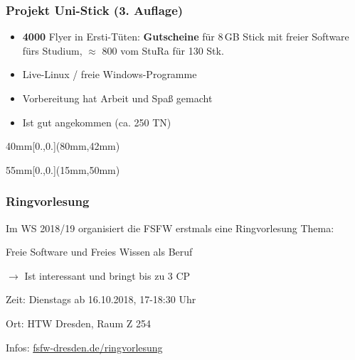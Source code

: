 \documentclass{beamer}
\begin{document}
\begin{frame}[label=ct1b,t]
  \frametitle{Projekt Uni-Stick (3. Auflage)}

  \begin{itemize}
  \item \textbf{4000} Flyer in Ersti-Tüten: \textbf{Gutscheine} für 8\,GB Stick mit freier Software
    fürs Studium, $\approx$ 800 \geneuro{} vom StuRa für 130 Stk.
  \item Live-Linux / freie Windows-Programme
    \pause
  \item Vorbereitung hat Arbeit und Spaß gemacht
    \pause
  \item Ist gut angekommen (ca. 250 TN)
  \end{itemize}

  \begin{textblock*}{40mm}[0.,0.](80mm,42mm)
  \end{textblock*}

  \begin{textblock*}{55mm}[0.,0.](15mm,50mm)
  \end{textblock*}
%
%

\end{frame}


\begin{frame}[label=ct25]
  \frametitle{Ringvorlesung}

  Im WS 2018/19 organisiert die FSFW erstmals eine Ringvorlesung
  \medskip
  Thema:

  \begin{center}
   {\Large Freie Software und Freies Wissen als Beruf}
  \end{center}

  \smallskip
  $\rightarrow$ Ist interessant und bringt bis zu 3 CP

  \bigskip
  Zeit: Dienstags ab 16.10.2018, 17-18:30 Uhr

  \smallskip
  Ort: HTW Dresden, Raum Z 254

  \smallskip
  Infos: \url{fsfw-dresden.de/ringvorlesung}


\end{frame}
\end{document}
